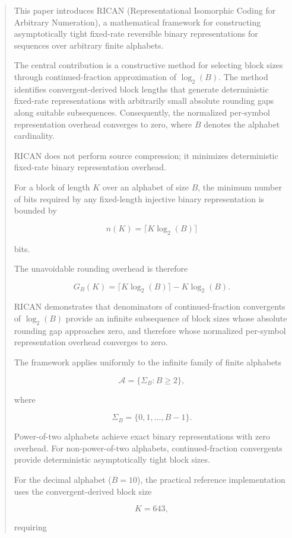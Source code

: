 \documentclass[onecolumn]{IEEEtran}
\begin{document}
\begin{abstract}

This paper introduces RICAN (Representational Isomorphic Coding for
Arbitrary Numeration), a mathematical framework for constructing
asymptotically tight fixed-rate reversible binary representations for
sequences over arbitrary finite alphabets.

The central contribution is a constructive method for selecting block
sizes through continued-fraction approximation of $\log_2(B)$.
The method identifies convergent-derived block lengths that generate
deterministic fixed-rate representations with arbitrarily small absolute
rounding gaps along suitable subsequences. Consequently, the normalized
per-symbol representation overhead converges to zero, where $B$ denotes
the alphabet cardinality.

RICAN does not perform source compression; it minimizes deterministic
fixed-rate binary representation overhead.

For a block of length $K$ over an alphabet of size $B$, the minimum
number of bits required by any fixed-length injective binary
representation is bounded by

\[
n(K)=\lceil K\log_2(B)\rceil
\]

bits.

The unavoidable rounding overhead is therefore

\[
G_B(K)=
\lceil K\log_2(B)\rceil-K\log_2(B).
\]

RICAN demonstrates that denominators of continued-fraction
convergents of $\log_2(B)$ provide an infinite subsequence of block
sizes whose absolute rounding gap approaches zero, and therefore
whose normalized per-symbol representation overhead converges to
zero.

The framework applies uniformly to the infinite family of finite
alphabets

\[
\mathcal{A}=\{\Sigma_B:B\geq2\},
\]

where

\[
\Sigma_B=\{0,1,\ldots,B-1\}.
\]

Power-of-two alphabets achieve exact binary representations with zero
overhead. For non-power-of-two alphabets, continued-fraction
convergents provide deterministic asymptotically tight block sizes.

For the decimal alphabet ($B=10$), the practical reference
implementation uses the convergent-derived block size

\[
K=643,
\]

requiring


\end{abstract}
\end{document}
